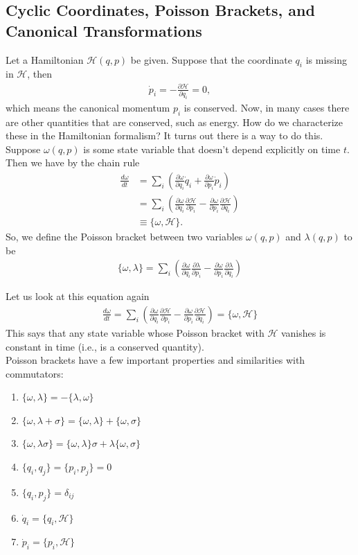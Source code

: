 \documentclass{book}
\theoremstyle{definition}
\newcommand{\p}{\partial}
\newcommand{\ham}{\mathcal{H}}
\newcommand{\f}[2]{\frac{#1}{#2}}
\newcommand{\lp}{\left(}
\newcommand{\rp}{\right)}
\begin{document}
\subsection{Cyclic Coordinates, Poisson Brackets, and Canonical Transformations}
Let a Hamiltonian $\ham(q,p)$ be given. Suppose that the coordinate $q_i$ is missing in $\ham$, then 
\begin{align}
\dot{p}_i = -\f{\p \ham}{\p q_i} = 0,
\end{align}
which means the canonical momentum $p_i$ is conserved. Now, in many cases there are other quantities that are conserved, such as energy. How do we characterize these in the Hamiltonian formalism? It turns out there is a way to do this. \\

Suppose $\omega(q,p)$ is some state variable that doesn't depend explicitly on time $t$. Then we have by the chain rule
\begin{align}
\f{d\omega}{dt} 
&= \sum_i \lp \f{\p \omega}{\p q_i}\dot{q}_i + \f{\p \omega}{\p p_i}\dot{p}_i \rp\\
&= \sum_i \lp \f{\p \omega}{\p q_i}\f{\p \ham}{\p p_i} - \f{\p \omega}{\p p_i}\f{\p \ham}{\p q_i} \rp\\
&\equiv \{ \omega, \ham \}.
\end{align}
So, we define the Poisson bracket between two variables $\omega(q,p)$ and $\lambda(q,p)$ to be
\begin{align}
\boxed{\{\omega,\lambda\} = \sum_i \lp \f{\p \omega}{\p q_i}\f{\p \lambda}{\p p_i} - \f{\p \omega}{\p p_i}\f{\p \lambda}{\p q_i} \rp}
\end{align}

Let us look at this equation again
\begin{align}
\f{d\omega}{dt} = \sum_i \lp \f{\p \omega}{\p q_i}\f{\p \ham}{\p p_i} - \f{\p \omega}{\p p_i}\f{\p \ham}{\p q_i} \rp = \{ \omega, \ham \}
\end{align}
This says that any state variable whose Poisson bracket with $\ham$ vanishes is constant in time (i.e., is a conserved quantity). \\

Poisson brackets have a few important properties and similarities with commutators:
\begin{enumerate}
	\item $\{\omega, \lambda\} = -\{ \lambda,\omega    \}$
	\item $\{\omega, \lambda + \sigma \} = 
	\{\omega, \lambda  \}
	+
	\{\omega,  \sigma \}$
	\item $\{\omega, \lambda \sigma \} = 
	\{\omega, \lambda  \}\sigma
	+
	\lambda\{\omega,  \sigma \}$
	\item $\{ q_i,q_j \} = \{ p_i , p_j \} = 0$
	\item $\{ q_i, p_j  \} = \delta_{ij}$
	\item $\dot{q}_i = \{ q_i,\ham   \}$
	\item $\dot{p}_i = \{ p_i,\ham   \}$
\end{enumerate}
\end{document}
